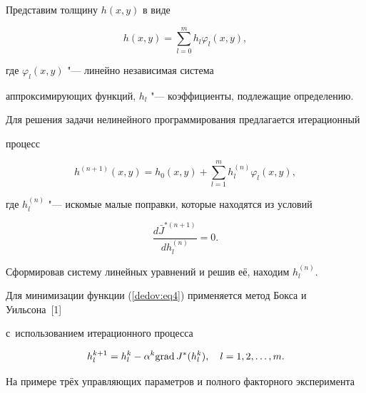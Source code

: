 Представим толщину $h(x, y)$ в виде

\begin{equation}

\label{dedov:eq6}

h(x, y)=\sum\limits_{l=0}^m h_l \varphi _l(x, y) ,

\end{equation}

где $\varphi _l (x, y)$ "--- линейно независимая система

аппроксимирующих функций, $h_l $ "--- коэффициенты, подлежащие определению.



Для решения задачи нелинейного программирования предлагается итерационный

процесс

\begin{equation}

\label{dedov:eq7}

h^{(n+1)}(x, y)=h_0 (x, y)+\sum\limits_{l=1}^m h_l^{(n)} \varphi_l (x, y) ,

\end{equation}

где $h_l^{(n)} $ "--- искомые малые поправки, которые находятся из условий

\begin{equation}

\label{dedov:eq8}

\frac{d\bar {J}^{\ast (n+1)}}{dh_l^{(n)} }=0.

\end{equation}

Сформировав систему линейных уравнений и решив её, находим $h_l^{(n)} $.



Для минимизации функции (\ref{dedov:eq4}) применяется метод Бокса и Уильсона~[1]

с~использованием итерационного процесса

\begin{equation}

\label{dedov:eq9}

h_l^{k+1} =h_l^k -\alpha ^k{\rm grad}\,J^\ast (h_l^k ),

\quad

l=1, 2, \dots, m .

\end{equation}



На примере трёх управляющих параметров и полного факторного эксперимента

